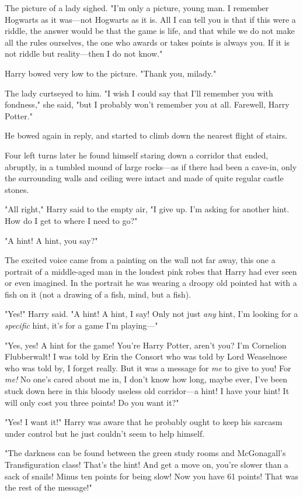 The picture of a lady sighed. "I'm only a picture, young man. I remember 
Hogwarts as it was---not Hogwarts as it is. All I can tell you is that if this 
were a riddle, the answer would be that the game is life, and that while we do 
not make all the rules ourselves, the one who awards or takes points is always 
you. If it is not riddle but reality---then I do not know."

Harry bowed very low to the picture. "Thank you, milady."

The lady curtseyed to him. "I wish I could say that I'll remember you with 
fondness," she said, "but I probably won't remember you at all. Farewell, Harry 
Potter."

He bowed again in reply, and started to climb down the nearest flight of stairs.

Four left turns later he found himself staring down a corridor that ended, 
abruptly, in a tumbled mound of large rocks---as if there had been a cave-in, 
only the surrounding walls and ceiling were intact and made of quite regular 
castle stones.

"All right," Harry said to the empty air, "I give up. I'm asking for another 
hint. How do I get to where I need to go?"

"A hint! A hint, you say?"

The excited voice came from a painting on the wall not far away, this one a 
portrait of a middle-aged man in the loudest pink robes that Harry had ever 
seen or even imagined. In the portrait he was wearing a droopy old pointed hat 
with a fish on it (not a drawing of a fish, mind, but a fish).

"Yes!" Harry said. "A hint! A hint, I say! Only not just \emph{any} hint, I'm 
looking for a \emph{specific} hint, it's for a game I'm playing---"

"Yes, yes! A hint for the game! You're Harry Potter, aren't you? I'm Cornelion 
Flubberwalt! I was told by Erin the Consort who was told by Lord Weaselnose who 
was told by, I forget really. But it was a message for \emph{me} to give to 
you! For \emph{me!} No one's cared about me in, I don't know how long, maybe 
ever, I've been stuck down here in this bloody useless old corridor---a hint! I 
have your hint! It will only cost you three points! Do you want it?"

"Yes! I want it!" Harry was aware that he probably ought to keep his sarcasm 
under control but he just couldn't seem to help himself.

"The darkness can be found between the green study rooms and McGonagall's 
Transfiguration class! That's the hint! And get a move on, you're slower than a 
sack of snails! Minus ten points for being slow! Now you have 61 points! That 
was the rest of the message!"

